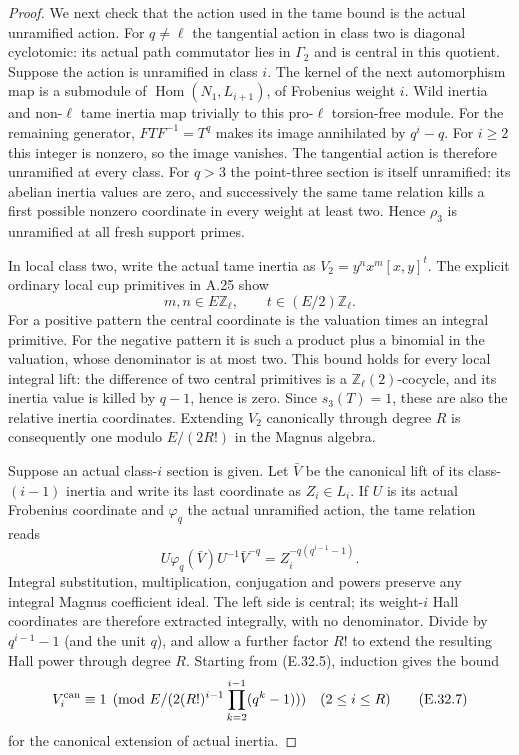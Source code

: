 \begin{proof}
We next check that the action used in the tame bound is the actual
unramified action.  For $q\ne\ell$ the tangential action in class
two is diagonal cyclotomic: its actual path commutator lies in
$\Gamma_2$ and is central in this quotient.  Suppose the action is
unramified in class $i$.  The kernel of the next automorphism map is
a submodule of $\operatorname{Hom}(N_1,L_{i+1})$, of Frobenius
weight $i$.  Wild inertia and non-$\ell$ tame inertia map trivially
to this pro-$\ell$ torsion-free module.  For the remaining generator,
$FTF^{-1}=T^q$ makes its image annihilated by $q^i-q$.  For $i\ge2$
this integer is nonzero, so the image vanishes.  The tangential action
is therefore unramified at every class.  For $q>3$ the point-three
section is itself unramified: its abelian inertia values are zero,
and successively the same tame relation kills a first possible
nonzero coordinate in every weight at least two.  Hence $\rho_3$
is unramified at all fresh support primes.

In local class two, write the actual tame inertia as
$V_2=y^n x^m [x,y]^t$.  The explicit ordinary local cup primitives in
A.25 show
\[
                m,n\in E\mathbb Z_\ell,\qquad
                t\in(E/2)\mathbb Z_\ell.
 \tag{E.32.5}
\]
For a positive pattern the central coordinate is the valuation times
an integral primitive.  For the negative pattern it is such a product
plus a binomial in the valuation, whose denominator is at most two.
This bound holds for every local integral lift: the difference of
two central primitives is a $\mathbb Z_\ell(2)$-cocycle, and its
inertia value is killed by $q-1$, hence is zero.  Since $s_3(T)=1$,
these are also the relative inertia coordinates.  Extending $V_2$
canonically through degree $R$ is consequently one modulo
$E/(2R!)$ in the Magnus algebra.

Suppose an actual class-$i$ section is given.  Let $\bar V$ be the
canonical lift of its class-$(i-1)$ inertia and write its last
coordinate as $Z_i\in L_i$.  If $U$ is its actual Frobenius coordinate
and $\varphi_q$ the actual unramified action, the tame relation reads
\[
 U\varphi_q(\bar V)U^{-1}\bar V^{-q}
                     = Z_i^{-q(q^{i-1}-1)}.
 \tag{E.32.6}
\]
Integral substitution, multiplication, conjugation and powers preserve
any integral Magnus coefficient ideal.  The left side is central;
its weight-$i$ Hall coordinates are therefore extracted integrally,
with no denominator.  Divide by $q^{i-1}-1$ (and the unit $q$), and
allow a further factor $R!$ to extend the resulting Hall power through
degree $R$.  Starting from (E.32.5), induction gives the bound
\[
 V_i^{\rm can}\equiv1\pmod{
 E/(2(R!)^{i-1}\prod_{k=2}^{i-1}(q^k-1))}
                  \quad(2\le i\le R)
 \tag{E.32.7}
\]
for the canonical extension of actual inertia.


\end{proof}
